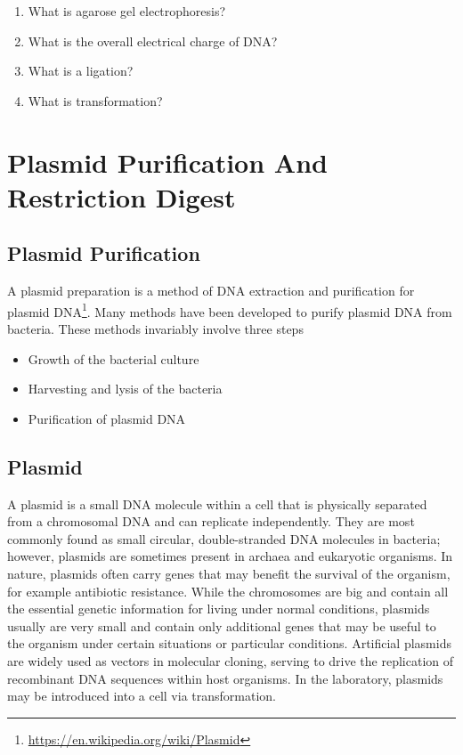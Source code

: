 \documentclass[]{book}
\providecommand{\tightlist}{%
  \setlength{\itemsep}{0pt}\setlength{\parskip}{0pt}}
\let\rmarkdownfootnote\footnote%
\def\footnote{\protect\rmarkdownfootnote}
\renewcommand{\href}[2]{#2\footnote{\url{#1}}}
\begin{document}
\begin{enumerate}
\def\labelenumi{\arabic{enumi}.}
\tightlist
\item
  What is agarose gel electrophoresis?
\item
  What is the overall electrical charge of DNA?
\item
  What is a ligation?
\item
  What is transformation?
\end{enumerate}

\chapter{Plasmid Purification And Restriction
Digest}\label{plasmid-purification-and-restriction-digest}

\section{Plasmid Purification}\label{plasmid-purification}

A plasmid preparation is a method of DNA extraction and purification for
\href{https://en.wikipedia.org/wiki/Plasmid}{plasmid DNA}. Many methods
have been developed to purify plasmid DNA from bacteria. These methods
invariably involve three steps

\begin{itemize}
\tightlist
\item
  Growth of the bacterial culture
\item
  Harvesting and lysis of the bacteria
\item
  Purification of plasmid DNA
\end{itemize}

\section{Plasmid}\label{plasmid}

A plasmid is a small DNA molecule within a cell that is physically
separated from a chromosomal DNA and can replicate independently. They
are most commonly found as small circular, double-stranded DNA molecules
in bacteria; however, plasmids are sometimes present in archaea and
eukaryotic organisms. In nature, plasmids often carry genes that may
benefit the survival of the organism, for example antibiotic resistance.
While the chromosomes are big and contain all the essential genetic
information for living under normal conditions, plasmids usually are
very small and contain only additional genes that may be useful to the
organism under certain situations or particular conditions. Artificial
plasmids are widely used as vectors in molecular cloning, serving to
drive the replication of recombinant DNA sequences within host
organisms. In the laboratory, plasmids may be introduced into a cell via
transformation.
\end{document}
